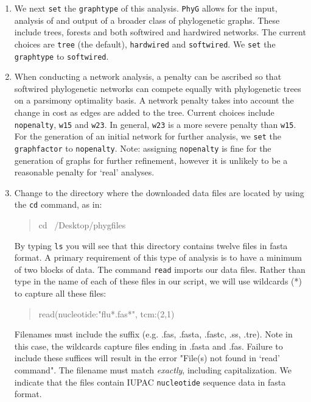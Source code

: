 \documentclass[11pt]{article}
\newcommand{\phyg}{\texttt{PhyG} }
\begin{document}
\begin{enumerate}
\item We next \texttt{set} the \texttt{graphtype} of this analysis. \phyg allows for 
the input, analysis of and output of a broader class of phylogenetic graphs. These
include trees, forests and both softwired and hardwired networks. The current choices 
are \texttt{tree} (the default), \texttt{hardwired} and \texttt{softwired}. We \texttt{set} 
the \texttt{graphtype} to \texttt{softwired}.

\item When conducting a network analysis, a penalty can be ascribed so that 
softwired phylogenetic networks can compete equally with phylogenetic trees on 
a parsimony optimality basis. A network penalty takes into account the change in 
cost as edges are added to the tree. Current choices include \texttt{nopenalty}, 
\texttt{w15} and \texttt{w23}. In general, \texttt{w23} is a more severe penalty than
\texttt{w15}. For the generation of an initial network for further analysis, we 
\texttt{set} the \texttt{graphfactor} to \texttt{nopenalty}. Note: assigning \texttt{nopenalty}
is fine for the generation of graphs for further refinement, however it is unlikely 
to be a reasonable penalty for `real' analyses.

\item Change to the directory where the downloaded data files are located by using the 
\texttt{cd} command, as in:
		
	\begin{quote}
	cd ~/Desktop/phygfiles
	\end{quote}

By typing \texttt{ls} you will see that this directory contains twelve files in fasta format.
A primary requirement of this type of analysis is to have a minimum of two blocks of 
data. The command \texttt{read} imports our data files. Rather than type in the name 
of each of these files in our script, we will use wildcards (*) to capture all these files: 
        
        \begin{quote}
	read(nucleotide:"flu*.fas*", tcm:(2,1)\\
	\end{quote}

Filenames must include the suffix (e.g. .fas, .fasta, .fastc, .ss, .tre). Note in this case, 
the wildcards capture files ending in .fasta and .fas. Failure to include these suffices 
will result in the error "File(s) not found in `read' command". The filename must match 
\textit{exactly}, including capitalization. We indicate that the files contain IUPAC 
\texttt{nucleotide} sequence data in fasta format.


\end{enumerate}
\end{document}
